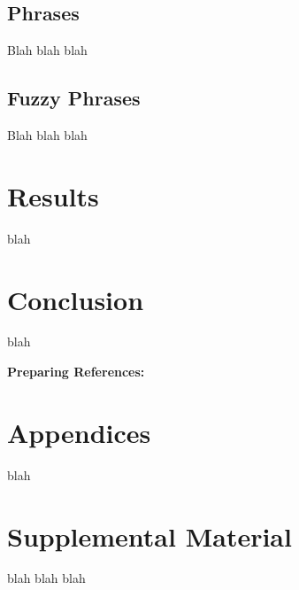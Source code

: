 \documentclass[11pt,a4paper]{article}
\begin{document}
\subsection{Phrases}

Blah blah blah

\subsection{Fuzzy Phrases}

Blah blah blah

\section{Results}

blah

\section{Conclusion}

blah

\noindent \textbf{Preparing References:} \\




\appendix

\section{Appendices}
\label{sec:appendix}

blah 

\section{Supplemental Material}
\label{sec:supplemental}
blah blah blah
\end{document}
